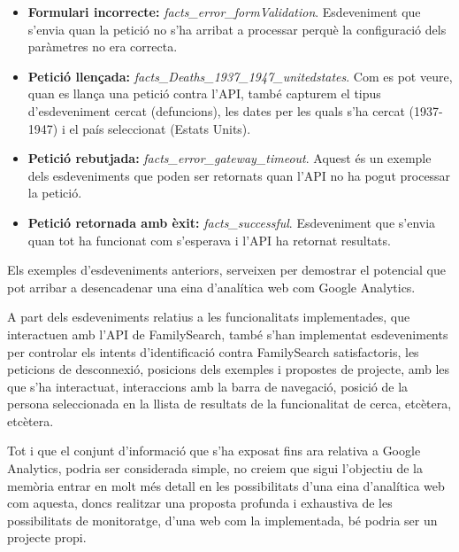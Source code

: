    \begin{itemize}
        \item \textbf{Formulari incorrecte:} \emph{facts\_error\_formValidation}. Esdeveniment que s'en\-via quan la petició no s'ha arribat a processar perquè la configuració dels paràmetres no era correcta.
        \item \textbf{Petició llençada:} \emph{facts\_Deaths\_1937\_1947\_unitedstates}. Com es pot veure, quan es llança una petició contra l'API, també capturem el tipus d'esdeveniment cercat (defuncions), les dates per les quals s'ha cercat (1937-1947) i el país seleccionat (Estats Units).
        \item \textbf{Petició rebutjada:} \emph{facts\_error\_gateway\_timeout}. Aquest és un exemple dels esdeveniments que poden ser retornats quan l'API no ha pogut processar la petició.
        \item \textbf{Petició retornada amb èxit:} \emph{facts\_successful}. Esdeveniment que s'envia quan tot ha funcionat com s'esperava i l'API ha retornat resultats.
    \end{itemize}

    Els exemples d'esdeveniments anteriors, serveixen per demostrar el potencial que pot arribar a desencadenar una eina d'analítica web com Google Analytics.

    A part dels esdeveniments relatius a les funcionalitats implementades, que interactuen amb l'API de FamilySearch, també s'han implementat esdeveniments per controlar els intents d'identificació contra FamilySearch satisfactoris, les peticions de desconnexió, posicions dels exemples i propostes de projecte, amb les que s'ha interactuat, interaccions amb la barra de navegació, posició de la persona seleccionada en la llista de resultats de la funcionalitat de cerca, etcètera, etcètera.

    Tot i que el conjunt d'informació que s'ha exposat fins ara relativa a Google Analytics, podria ser considerada simple, no creiem que sigui l'objectiu de la memòria entrar en molt més detall en les possibilitats d'una eina d'analítica web com aquesta, doncs realitzar una proposta profunda i exhaustiva de les possibilitats de monitoratge, d'una web com la implementada, bé podria ser un projecte propi.
